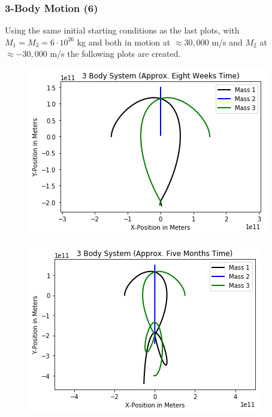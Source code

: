 \documentclass{beamer}
\begin{document}
\begin{frame}
\frametitle{3-Body Motion (6)}
Using the same initial starting conditions as the last plots, with $M_1=M_3=6\cdot10^{26}$ kg and both in motion at $\approx30,000$ m/s and $M_2$ at $\approx -30,000$ m/s the following plots are created.
\begin{multicols}{2}
\begin{figure}
\begin{center}
\includegraphics[width=1.0\linewidth]{3BodyDynamics13.png}
\end{center}
\end{figure}
\begin{figure}
\begin{center}
\includegraphics[width=1.0\linewidth]{3BodyDynamics14.png}
\end{center}
\end{figure}
\end{multicols}
\end{frame}
\end{document}

